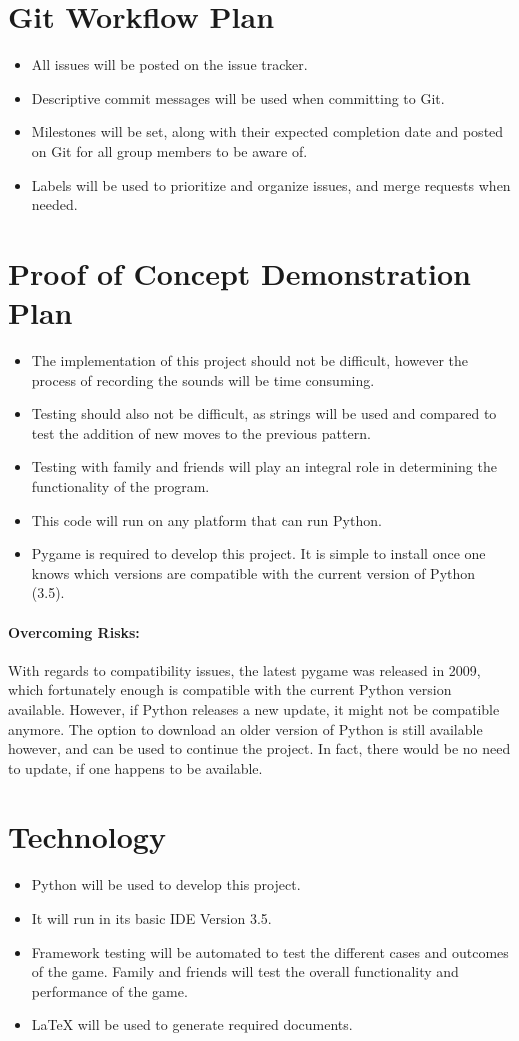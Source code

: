 \documentclass{article}
\begin{document}
\section{Git Workflow Plan}


\begin{itemize}
\item All issues will be posted on the issue tracker.
\item Descriptive commit messages will be used when committing to Git. 
\item Milestones will be set, along with their expected completion date and posted on Git for all group members to be aware of.
\item Labels will be used to prioritize and organize issues, and merge requests when needed.
\end{itemize}
\section{Proof of Concept Demonstration Plan}
\begin{itemize}
\item The implementation of this project should not be difficult, however the process of recording the sounds will be time consuming.
\item Testing should also not be difficult, as strings will be used and compared to test the addition of new moves to the previous pattern.
\item Testing with family and friends will play an integral role in determining the functionality of the program.
\item This code will run on any platform that can run Python.
\item Pygame is required to develop this project. It is simple to install once one knows which versions are compatible with the current version of Python (3.5).
\end{itemize}
\paragraph{Overcoming Risks:}
With regards to compatibility issues, the latest pygame was released in 2009, which fortunately enough is compatible with the current Python version available. However, if Python releases a new update, it might not be compatible anymore. The option to download an older version of Python is still available however, and can be used to continue the project. In fact, there would be no need to update, if one happens to be available.
\section{Technology}
\begin{itemize}
\item Python will be used to develop this project.
\item It will run in its basic IDE Version 3.5.
\item Framework testing will be automated to test the different cases and outcomes of the game. Family and friends will test the overall functionality and performance of the game.
\item LaTeX will be used to generate required documents.
\end{itemize}
\end{document}
